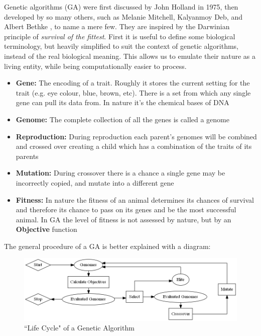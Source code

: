 \documentclass[11pt]{article}
\begin{document}
    Genetic algorithms (GA) were first 
    discussed by John Holland \cite{Holland} in 1975, then developed by so many
    others, such as Melanie Mitchell, Kalyanmoy Deb, and Albert Bethke
    \cite{Mitchell, KalyanmoyDeb, Bethke, Goldberg, Grefenstette}, to name a mere few.
    They are inspired by the Darwinian
    principle of \textit{survival of the fittest}.
    First it is useful to define some biological terminology, but heavily simplified to suit the
    context of genetic algorithms, instead of the real biological meaning. This allows us to
    emulate their nature as a living entity, while being computationally easier to process.

    \begin{itemize}
        \item{\textbf{Gene:} The encoding of a trait. Roughly it stores the current
            setting for the trait (e.g. eye colour, blue, brown, etc). There is a set
            from which any single gene can pull its data from. In nature it's the chemical
            bases  of DNA}
        \item{\textbf{Genome:} The complete collection of all the genes is called a
            genome}
        \item{\textbf{Reproduction:} During reproduction each parent's genomes will be
            combined and crossed over creating a child which has a combination of
            the traits of its parents}
        \item{\textbf{Mutation:} During crossover there is a chance a single gene
            may be incorrectly copied, and mutate into a different gene}
        \item{\textbf{Fitness: } In nature the fitness of an animal determines
            its chances of survival and therefore its chance to pass on its genes
            and be the most successful animal. In GA the level of fitness is not assessed
            by nature, but by an \textbf{Objective} function}
    \end{itemize}

    The general procedure of a GA is better explained with a diagram:

    \begin{figure}[H] %
        \centering
        \includegraphics[width=\textwidth]{GA}
        \caption{``Life Cycle" of a Genetic Algorithm}\label{fig:GA}
    \end{figure}
\end{document}
